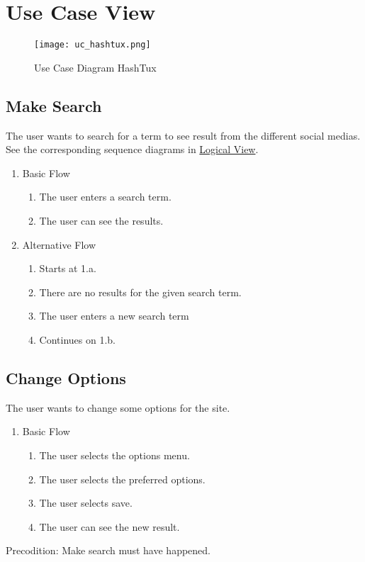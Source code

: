 \chapter{Use Case View}

\begin{figure}[ht]
  \centering
  \texttt{[image: uc\_hashtux.png]}
  \caption{Use Case Diagram HashTux}
\end{figure}

\section{Make Search}
The user wants to search for a term to see result from the different social
medias. See the corresponding sequence diagrams in
\hyperlink{logicalview}{Logical View}.
\begin{enumerate}
  \item Basic Flow
  \begin{enumerate}
    \item The user enters a search term.
    \item The user can see the results.
  \end{enumerate}
  \item Alternative Flow
  \begin{enumerate}
    \item Starts at 1.a.
    \item There are no results for the given search term.
    \item The user enters a new search term
    \item Continues on 1.b.
  \end{enumerate}
\end{enumerate}

\section{Change Options}
The user wants to change some options for the site.
\begin{enumerate}
\item Basic Flow
  \begin{enumerate}
    \item The user selects the options menu.
    \item The user selects the preferred options.
    \item The user selects save.
    \item The user can see the new result.
  \end{enumerate}
\end{enumerate}
Precodition: \newline
Make search must have happened.

